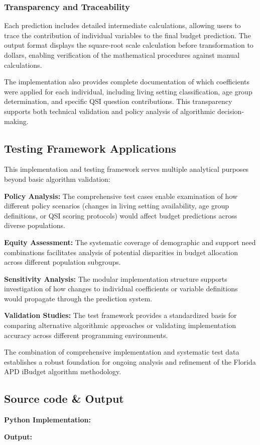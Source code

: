 \subsubsection{Transparency and Traceability}

Each prediction includes detailed intermediate calculations, allowing users to trace the contribution of individual variables to the final budget prediction. The output format displays the square-root scale calculation before transformation to dollars, enabling verification of the mathematical procedures against manual calculations.

The implementation also provides complete documentation of which coefficients were applied for each individual, including living setting classification, age group determination, and specific QSI question contributions. This transparency supports both technical validation and policy analysis of algorithmic decision-making.

\subsection{Testing Framework Applications}

This implementation and testing framework serves multiple analytical purposes beyond basic algorithm validation:

\textbf{Policy Analysis:} The comprehensive test cases enable examination of how different policy scenarios (changes in living setting availability, age group definitions, or QSI scoring protocols) would affect budget predictions across diverse populations.

\textbf{Equity Assessment:} The systematic coverage of demographic and support need combinations facilitates analysis of potential disparities in budget allocation across different population subgroups.

\textbf{Sensitivity Analysis:} The modular implementation structure supports investigation of how changes to individual coefficients or variable definitions would propagate through the prediction system.

\textbf{Validation Studies:} The test framework provides a standardized basis for comparing alternative algorithmic approaches or validating implementation accuracy across different programming environments.

The combination of comprehensive implementation and systematic test data establishes a robust foundation for ongoing analysis and refinement of the Florida APD iBudget algorithm methodology.

\subsection{Source code \& Output}

\textbf{Python Implementation:}


\textbf{Output:}

